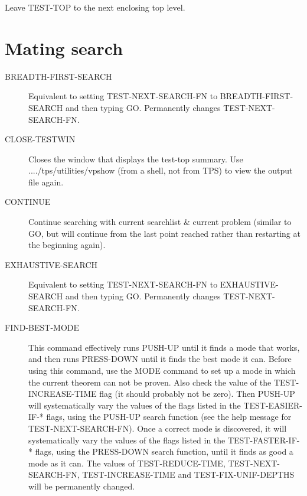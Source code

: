 \begin{description} 
\item[LEAVE]  
Leave TEST-TOP to the next enclosing top level.
\item
\end{description}

\section{Mating search}

\begin{description} 
\item[BREADTH-FIRST-SEARCH]  
Equivalent to setting TEST-NEXT-SEARCH-FN to BREADTH-FIRST-SEARCH
and then typing GO. Permanently changes TEST-NEXT-SEARCH-FN.

\item[CLOSE-TESTWIN]  
Closes the window that displays the test-top summary.
Use ..../tps/utilities/vpshow (from a shell, not from TPS) 
to view the output file again.

\item[CONTINUE]  
Continue searching with current searchlist \&  current problem
(similar to GO, but will continue from the last point reached rather
than restarting at the beginning again).

\item[EXHAUSTIVE-SEARCH]  
Equivalent to setting TEST-NEXT-SEARCH-FN to EXHAUSTIVE-SEARCH
and then typing GO. Permanently changes TEST-NEXT-SEARCH-FN.

\item[FIND-BEST-MODE]  
This command effectively runs PUSH-UP until it finds
a mode that works, and then runs PRESS-DOWN until it finds the
best mode it can.
Before using this command, use the MODE command to 
set up a mode in which the current theorem can not be proven. Also
check the value of the TEST-INCREASE-TIME flag (it should probably
not be zero).
Then PUSH-UP will systematically vary the values of the flags
listed in the TEST-EASIER-IF-* flags, using the PUSH-UP search
function (see the help message for TEST-NEXT-SEARCH-FN).
Once a correct mode is discovered, it will systematically vary
the values of the flags listed in the TEST-FASTER-IF-* flags,
using the PRESS-DOWN search function, until it finds as good a 
mode as it can.
The values of TEST-REDUCE-TIME, TEST-NEXT-SEARCH-FN, 
TEST-INCREASE-TIME and TEST-FIX-UNIF-DEPTHS will be permanently
changed.


\end{description}
